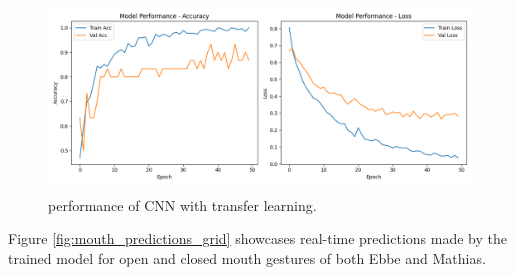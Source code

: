 \documentclass{report}
\begin{document}
\begin{figure}[H]
    \centering
    \includegraphics[height=50mm, keepaspectratio]{report_images/transfer_performance.png}
    \caption{performance of CNN with transfer learning.}
    \label{fig:transfer}
\end{figure}

Figure \ref{fig:mouth_predictions_grid} showcases real-time predictions made by the trained model for open and closed mouth gestures of both Ebbe and Mathias.
\end{document}
